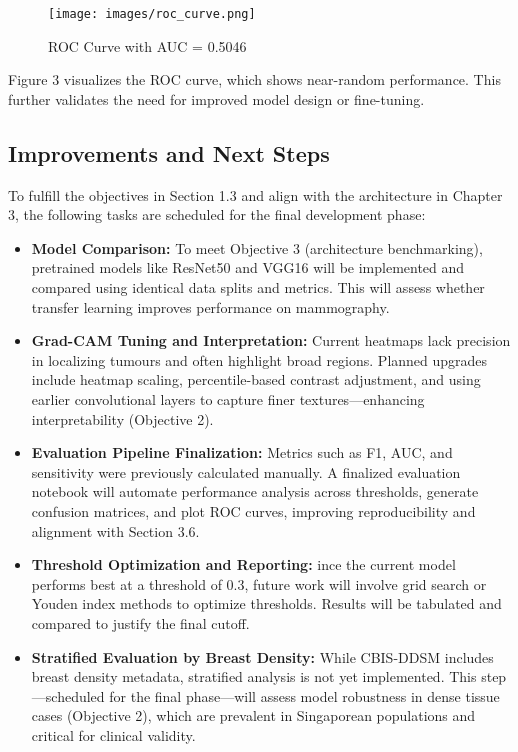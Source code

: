 \documentclass[12pt]{article}
\begin{document}
\begin{figure}[H]
\centering
\texttt{[image: images/roc\_curve.png]}
\caption{ROC Curve with AUC = 0.5046}
\end{figure}
Figure 3 visualizes the ROC curve, which shows near-random performance. This further validates the need for improved model design or fine-tuning.

\subsection{Improvements and Next Steps}
\label{improvements}
To fulfill the objectives in Section 1.3 and align with the architecture in Chapter 3, the following tasks are scheduled for the final development phase:

\begin{itemize}
    \item \textbf{Model Comparison:} To meet Objective 3 (architecture benchmarking), pretrained models like ResNet50 and VGG16 will be implemented and compared using identical data splits and metrics. This will assess whether transfer learning improves performance on mammography.

    \item \textbf{Grad-CAM Tuning and Interpretation:} Current heatmaps lack precision in localizing tumours and often highlight broad regions. Planned upgrades include heatmap scaling, percentile-based contrast adjustment, and using earlier convolutional layers to capture finer textures—enhancing interpretability (Objective 2).

    \item \textbf{Evaluation Pipeline Finalization:} Metrics such as F1, AUC, and sensitivity were previously calculated manually. A finalized evaluation notebook will automate performance analysis across thresholds, generate confusion matrices, and plot ROC curves, improving reproducibility and alignment with Section 3.6.

    \item \textbf{Threshold Optimization and Reporting:} ince the current model performs best at a threshold of 0.3, future work will involve grid search or Youden index methods to optimize thresholds. Results will be tabulated and compared to justify the final cutoff.
    
    \item \textbf{Stratified Evaluation by Breast Density:} 
    While CBIS-DDSM includes breast density metadata, stratified analysis is not yet implemented. This step—scheduled for the final phase—will assess model robustness in dense tissue cases (Objective 2), which are prevalent in Singaporean populations and critical for clinical validity.
\end{itemize}
\end{document}
